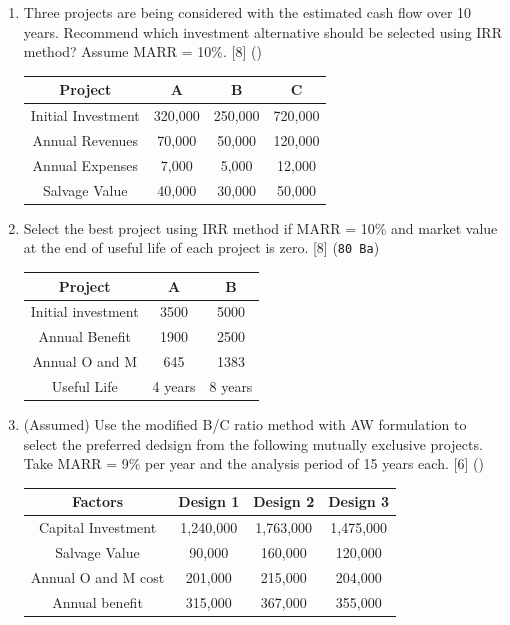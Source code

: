 \documentclass[12pt]{article}
\begin{document}
\begin{enumerate}[noitemsep, topsep=0pt]
		\item Three projects are being considered with the estimated cash flow over 10 years. Recommend which investment alternative should be selected using IRR method? Assume MARR = 10\%. \hfill [8] ()\\
		\begin{tabular}{|c|c|c|c|}
			\hline
			Project & A & B & C \\ \hline
			Initial Investment & 320,000 & 250,000 & 720,000 \\ \hline
			Annual Revenues & 70,000 & 50,000 & 120,000 \\ \hline
			Annual Expenses & 7,000 & 5,000 & 12,000 \\ \hline
			Salvage Value & 40,000 & 30,000 & 50,000 \\ \hline
		\end{tabular}
		
		\item Select the best project using IRR method if MARR = 10\% and market value at the end of useful life of each project is zero. \hfill [8] (\texttt{80 Ba})\\
		\begin{tabular}{|c|c|c|}
			\hline
			Project & A & B \\ \hline
			Initial investment & 3500 & 5000 \\ \hline
			Annual Benefit & 1900 & 2500 \\ \hline
			Annual O and M & 645 & 1383 \\ \hline
			Useful Life & 4 years & 8 years \\ \hline
		\end{tabular}
		
		\item (Assumed) Use the modified B/C ratio method with AW formulation to select the preferred dedsign from the following mutually exclusive projects. Take MARR = 9\% per year and the analysis period of 15 years each. \hfill [6] ()\\
		\begin{tabular}{|c|c|c|c|}
			\hline
			Factors & Design 1 & Design 2 & Design 3 \\ \hline
			Capital Investment & 1,240,000 & 1,763,000 & 1,475,000 \\ \hline
			Salvage Value & 90,000 & 160,000 & 120,000 \\ \hline
			Annual O and M cost & 201,000 & 215,000 & 204,000 \\ \hline
			Annual benefit & 315,000 & 367,000 & 355,000 \\ \hline
		\end{tabular}
		

\end{enumerate}
\end{document}
